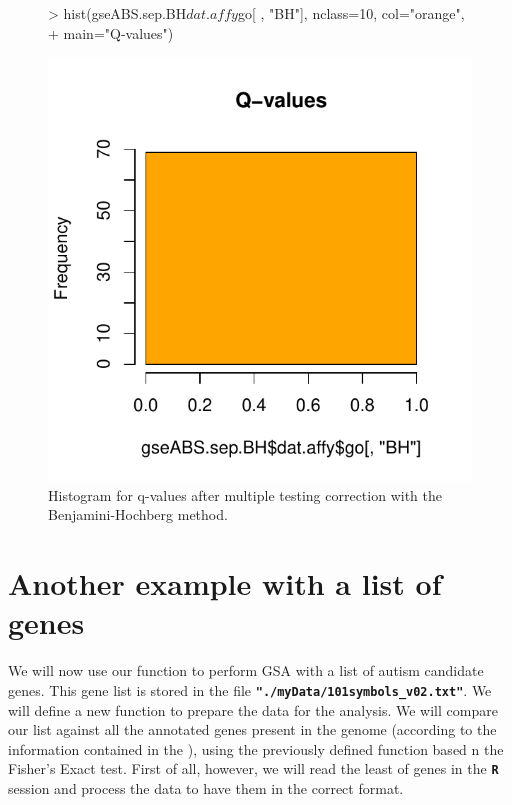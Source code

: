 \documentclass[11pt]{article}
\newcommand{\software}[1]{\textsf{\texttt{#1}}}
\newcommand{\R}{\software{\bf R}}
\newcommand{\Rcode}[1]{{\texttt{\color{BrickRed}{#1}}}}
\renewenvironment{Schunk}{\vspace{\topsep}}{\vspace{\topsep}}
\begin{document}
\begin{figure}[htbp]
\begin{center}
\begin{Schunk}
\begin{Sinput}
> hist(gseABS.sep.BH$dat.affy$go[ , "BH"], nclass=10, col="orange",
+      main="Q-values")
\end{Sinput}
\end{Schunk}
\includegraphics{Figures/plots-figure005}
\caption[\small P-value histogram]{\small
Histogram for q-values after multiple testing correction
with the Benjamini-Hochberg method.
}
\label{fig:figure005}
\end{center}
\end{figure}


\newpage
\section{Another example with a list of genes}
We will now use our function to perform GSA with a list of
autism candidate genes. This gene list is stored in the file
{\bf \texttt{"./myData/101symbols\_v02.txt"}}.
We will define a new function \Rcode{formatGeneList}
to prepare the data for the analysis.
We will compare our list against all the annotated
genes present in the genome (according to the information
contained in the \Rcode{org.Hs.eg.db}),
using the previously defined function based n the Fisher's Exact test.
First of all, however, we will read the least of genes in the {\R} session
and process the data to have them in the correct format.
\end{document}
